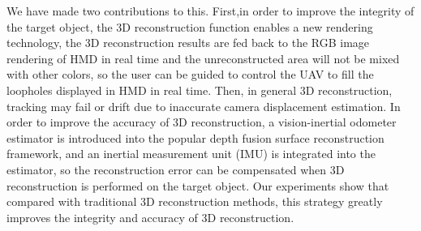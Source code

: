 \documentclass[journal]{IEEEtran}
\begin{document}
We have made two contributions to this. First,in order to improve the integrity of the target object, the 3D 
reconstruction function enables a new rendering technology, the 3D reconstruction results are 
fed back to the RGB image rendering\cite{Smith:1978:CGT:965139.807361} of HMD in real time and the unreconstructed area will not be mixed 
with other colors, so the user can be guided to control the UAV to fill the loopholes displayed in HMD\cite{8797791} 
in real time. Then, in general 3D reconstruction, tracking may fail or drift due to inaccurate camera displacement estimation.
In order to improve the accuracy of 3D reconstruction, a vision-inertial odometer 
estimator is introduced into the popular depth fusion surface reconstruction framework, 
and an inertial measurement unit (IMU) is integrated into the estimator, so the reconstruction 
error can be compensated when 3D reconstruction is performed on the target object. 
Our experiments show that compared with traditional 3D reconstruction methods, this 
strategy greatly improves the integrity and accuracy  of 3D reconstruction.




\end{document}

